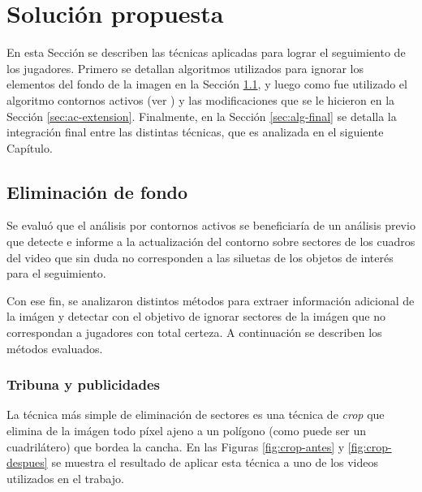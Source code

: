 \chapter{Solución propuesta}
\label{chap-solution}

En esta Sección se describen las técnicas aplicadas para lograr el seguimiento
de los jugadores. Primero se detallan algoritmos utilizados para ignorar los
elementos del fondo de la imagen en la Sección
\ref{sec:background-elimination}, y luego como fue utilizado el algoritmo
contornos activos (ver \cite{fast-level-set}) y las modificaciones que se le
hicieron en la Sección \ref{sec:ac-extension}. Finalmente, en la Sección
\ref{sec:alg-final} se detalla la integración final entre las distintas
técnicas, que es analizada en el siguiente Capítulo.

\section{Eliminación de fondo}

\label{sec:background-elimination}
Se evaluó que el análisis por contornos activos se beneficiaría de un análisis
previo que detecte e informe a la actualización del contorno sobre sectores de
los cuadros del video que sin duda no corresponden a las siluetas de los
objetos de interés para el seguimiento.

Con ese fin, se analizaron distintos métodos para extraer información adicional
de la imágen y detectar con el objetivo de ignorar sectores de la imágen que no
correspondan a jugadores con total certeza. A continuación se describen los
métodos evaluados.

\subsection{Tribuna y publicidades}
\label{subsec:crop-tribunas}

La técnica más simple de eliminación de sectores es una técnica de
\textit{crop} que elimina de la imágen todo píxel ajeno a un polígono
(como puede ser un cuadrilátero) que bordea la cancha. En las Figuras
\ref{fig:crop-antes} y \ref{fig:crop-despues} se muestra el resultado
de aplicar esta técnica a uno de los videos utilizados en el trabajo.

